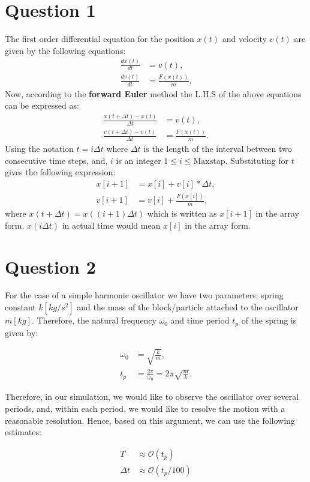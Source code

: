 \documentclass[10pt]{article}
\begin{document}
\section*{Question 1}
The first order differential equation for the position $x(t)$ and velocity $v(t)$ are given by the following equations:
\begin{align}
\frac{dx(t)}{dt} &= v(t), \\
\frac{dv(t)}{dt} &= \frac{F(x(t))}{m}.
\end{align}
%
Now, according to the \textbf{forward Euler} method the L.H.S of the above equations can be expressed  as:
\begin{align*}
\frac{x(t + \Delta t) - x(t)}{\Delta t} &= v(t), \\
\frac{v(t + \Delta t) - v(t)}{\Delta t} &= \frac{F(x(t))}{m}.
\end{align*}
%
Using the notation $t=i\Delta t$ where $\Delta t$ is the length of the interval between two consecutive time steps, and, $i$ is an integer $1\leq i \leq \mathrm{Maxstap}$. Substituting for $t$ gives the following expression:
%
\begin{align*}
x[i+1] &= x[i] + v[i]*\Delta t, \\
v[i+1] &= v[i] + \frac{F(x[i])}{m},
\end{align*}
%
where $x(t+\Delta t) = x((i+1)\Delta t)$ which is written as $x[i+1]$ in the array form. $x(i\Delta t)$ in actual time would mean $x[i]$ in the array form.

\section*{Question 2}
For the case of a simple harmonic oscillator we have two parameters: spring constant $k [kg/s^2]$ and the mass of the block/particle attached to the oscillator $m [kg]$. Therefore, the natural frequency $\omega_{0}$ and time period $t_{p}$ of the spring is given by:

\begin{align}
\omega_{0} &= \sqrt{\frac{k}{m}},\\
t_{p} &= \frac{2\pi}{\omega_{0}}=2\pi \sqrt{\frac{m}{k}}.
\end{align}

Therefore, in our simulation, we would like to observe the oscillator over several periods, and, within each period, we would like to resolve the motion with a reasonable resolution. Hence, based on this argument, we can use the following estimates:

\begin{align*}
T &\approx \mathcal{O}(t_{p}) \\
\Delta t &\approx \mathcal{O}(t_{p}/100) \\
\end{align*}
\end{document}
